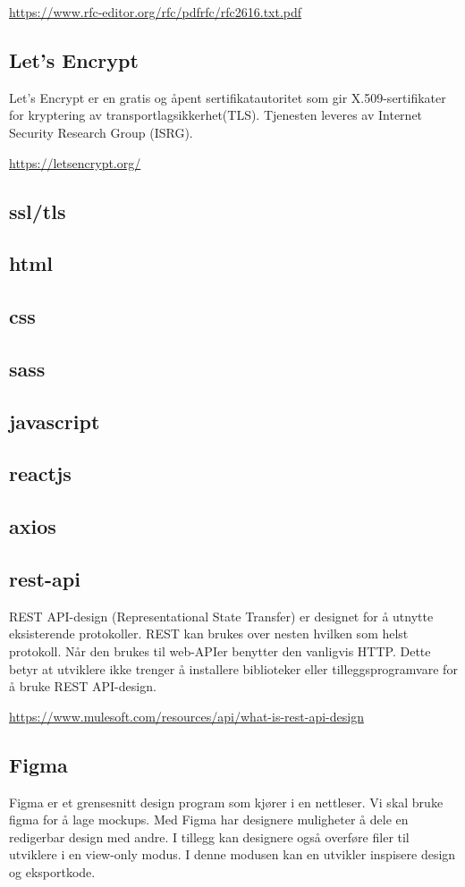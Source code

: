 \url{https://www.rfc-editor.org/rfc/pdfrfc/rfc2616.txt.pdf}

\subsection{Let’s Encrypt}
Let’s Encrypt er en gratis og åpent sertifikatautoritet som gir X.509-sertifikater for kryptering av transportlagsikkerhet(TLS). Tjenesten leveres av Internet Security Research Group (ISRG).

\url{https://letsencrypt.org/}

\subsection{ssl/tls}
\subsection{html}
\subsection{css}
\subsection{sass}
\subsection{javascript}
\subsection{reactjs}
\subsection{axios}
\subsection{rest-api}
REST API-design (Representational State Transfer) er designet for å utnytte eksisterende protokoller. REST kan brukes over nesten hvilken som helst protokoll. Når den brukes til web-APIer benytter den vanligvis HTTP. Dette betyr at utviklere ikke trenger å installere biblioteker eller tilleggsprogramvare for å bruke REST API-design.

\url{https://www.mulesoft.com/resources/api/what-is-rest-api-design}

\subsection{Figma}
Figma er et grensesnitt design program som kjører i en nettleser. Vi skal bruke figma for å lage mockups. Med Figma har designere muligheter å dele en redigerbar design med andre. I tillegg kan designere også overføre filer til utviklere i en view-only modus. I denne modusen kan en utvikler inspisere design og eksportkode.

